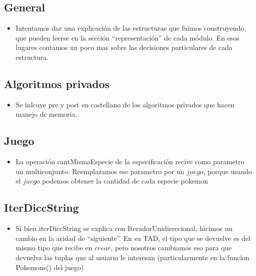 
\subsection{General}

\begin{itemize}

\item{Intentamos dar una explicaci\'on de las estructuras que fuimos construyendo, que pueden leerse en la secci\'on ``representaci\'on'' de cada m\'odulo. En esos lugares contamos un poco mas sobre las decisiones particulares de cada estructura.}

\end{itemize}


\subsection{Algoritmos privados}

\begin{itemize}

\item{Se inlcuye pre y post en castellano de los algoritmos privados que hacen manejo de memoria.}

\end{itemize}


\subsection{Juego}

\begin{itemize}
\item{La operaci\'on cantMismaEspecie de la especificaci\'on recive como parametro un multiconjunto. 
Reemplazamos ese parametro por un $juego$, porque usando el $juego$ podemos obtener la cantidad de cada especie pokemon}

\end{itemize}


\subsection{IterDiccString}

\begin{itemize}

\item{Si bien iterDiccString se explica con IteradorUnidireccional, hicimos un cambio en la aridad de ``siguiente''. En su TAD, el tipo que se devuelve es del mismo tipo que recibe en $crear$, pero nosotros cambiamos eso para que devuelva las tuplas que al usuario le interesan (particularmente en la funcion Pokemons() del juego)}

\end{itemize}


